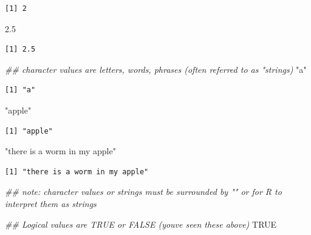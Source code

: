 \documentclass[
  letterpaper,
  DIV=11,
  numbers=noendperiod]{scrreprt}
\newenvironment{Shaded}{\begin{snugshade}}{\end{snugshade}}
\newcommand{\ConstantTok}[1]{\textcolor[rgb]{0.56,0.35,0.01}{#1}}
\newcommand{\DocumentationTok}[1]{\textcolor[rgb]{0.37,0.37,0.37}{\textit{#1}}}
\newcommand{\FloatTok}[1]{\textcolor[rgb]{0.68,0.00,0.00}{#1}}
\newcommand{\StringTok}[1]{\textcolor[rgb]{0.13,0.47,0.30}{#1}}
\begin{document}
\begin{verbatim}
[1] 2
\end{verbatim}

\begin{Shaded}
\begin{Highlighting}[]
\FloatTok{2.5}
\end{Highlighting}
\end{Shaded}

\begin{verbatim}
[1] 2.5
\end{verbatim}

\begin{Shaded}
\begin{Highlighting}[]
\DocumentationTok{\#\# character values are letters, words, phrases (often referred to as "strings)}
\StringTok{"a"}
\end{Highlighting}
\end{Shaded}

\begin{verbatim}
[1] "a"
\end{verbatim}

\begin{Shaded}
\begin{Highlighting}[]
\StringTok{"apple"}
\end{Highlighting}
\end{Shaded}

\begin{verbatim}
[1] "apple"
\end{verbatim}

\begin{Shaded}
\begin{Highlighting}[]
\StringTok{"there is a worm in my apple"}
\end{Highlighting}
\end{Shaded}

\begin{verbatim}
[1] "there is a worm in my apple"
\end{verbatim}

\begin{Shaded}
\begin{Highlighting}[]
\DocumentationTok{\#\# note: character values or strings must be surrounded by "" or \textquotesingle{}\textquotesingle{} for R to interpret them as strings}

\DocumentationTok{\#\# Logical values are TRUE or FALSE (you\textquotesingle{}ve seen these above)}
\ConstantTok{TRUE}
\end{Highlighting}
\end{Shaded}
\end{document}
